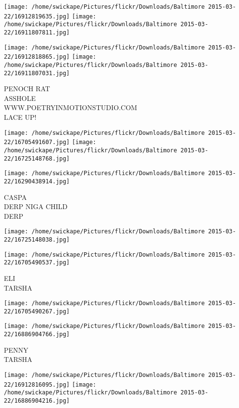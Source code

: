 \documentclass[10pt,letterpaper]{article}
\begin{document}
\texttt{[image: /home/swickape/Pictures/flickr/Downloads/Baltimore 2015-03-22/16912819635.jpg]}
\texttt{[image: /home/swickape/Pictures/flickr/Downloads/Baltimore 2015-03-22/16911807811.jpg]}

\texttt{[image: /home/swickape/Pictures/flickr/Downloads/Baltimore 2015-03-22/16912818865.jpg]}
\texttt{[image: /home/swickape/Pictures/flickr/Downloads/Baltimore 2015-03-22/16911807031.jpg]}

PENOCH RAT\\
ASSHOLE\\
WWW.POETRYINMOTIONSTUDIO.COM\\
LACE UP!\\
\pagebreak

\texttt{[image: /home/swickape/Pictures/flickr/Downloads/Baltimore 2015-03-22/16705491607.jpg]}
\texttt{[image: /home/swickape/Pictures/flickr/Downloads/Baltimore 2015-03-22/16725148768.jpg]}

\vspace{0.25in}
\texttt{[image: /home/swickape/Pictures/flickr/Downloads/Baltimore 2015-03-22/16290438914.jpg]}

CASPA\\
DERP NIGA CHILD\\
DERP\\
\pagebreak

\texttt{[image: /home/swickape/Pictures/flickr/Downloads/Baltimore 2015-03-22/16725148038.jpg]}

\vspace{0.25in}
\texttt{[image: /home/swickape/Pictures/flickr/Downloads/Baltimore 2015-03-22/16705490537.jpg]}

ELI\\
TARSHA\\
\pagebreak

\texttt{[image: /home/swickape/Pictures/flickr/Downloads/Baltimore 2015-03-22/16705490267.jpg]}

\vspace{0.25in}
\texttt{[image: /home/swickape/Pictures/flickr/Downloads/Baltimore 2015-03-22/16886904766.jpg]}

PENNY\\
TARSHA\\
\pagebreak

\texttt{[image: /home/swickape/Pictures/flickr/Downloads/Baltimore 2015-03-22/16912816095.jpg]}
\texttt{[image: /home/swickape/Pictures/flickr/Downloads/Baltimore 2015-03-22/16886904216.jpg]}
\end{document}

